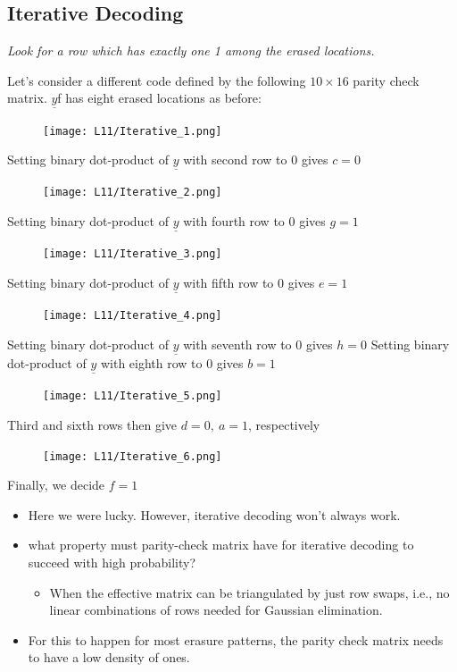 \documentclass[12pt]{article}
\begin{document}
\subsection{Iterative Decoding}
\begin{center}
    \large \textit{Look for a row which has exactly one 1 among the erased locations.}
\end{center}

Let's consider a different code defined by the following $10 \times 16$ parity check matrix. $\underline{y}$f has eight erased locations as before:
\begin{figure}[H]
    \centering
    \texttt{[image: L11/Iterative\_1.png]}
\end{figure}
 Setting binary dot-product of $\underline{y}$ with second row to 0 gives $c=0$
\begin{figure}[H]
    \centering
    \texttt{[image: L11/Iterative\_2.png]}
\end{figure}
 Setting binary dot-product of $\underline{y}$ with fourth row to 0 gives $g=1$
\begin{figure}[H]
    \centering
    \texttt{[image: L11/Iterative\_3.png]}
\end{figure}
 Setting binary dot-product of $\underline{y}$ with fifth row to 0 gives $e=1$
\begin{figure}[H]
    \centering
    \texttt{[image: L11/Iterative\_4.png]}
\end{figure}
 Setting binary dot-product of $\underline{y}$ with seventh row to 0 gives $h=0$
 Setting binary dot-product of $\underline{y}$ with eighth row to 0 gives $b=1$
\begin{figure}[H]
    \centering
    \texttt{[image: L11/Iterative\_5.png]}
\end{figure}
 Third and sixth rows then give $d=0, \: a=1$, respectively
\begin{figure}[H]
    \centering
    \texttt{[image: L11/Iterative\_6.png]}
\end{figure}
 Finally, we decide $f=1$
 
 \begin{itemize}
     \item  Here we were lucky. However, iterative decoding won't always work.
     \item what property must parity-check matrix have for iterative decoding to succeed with high probability?
     \begin{itemize}
         \item When the effective matrix can be triangulated by just row swaps, i.e., no linear combinations of rows needed for Gaussian elimination.
     \end{itemize}
     \item For this to happen for most erasure patterns, the parity check matrix needs to have a low density of ones.
 \end{itemize}
\end{document}
